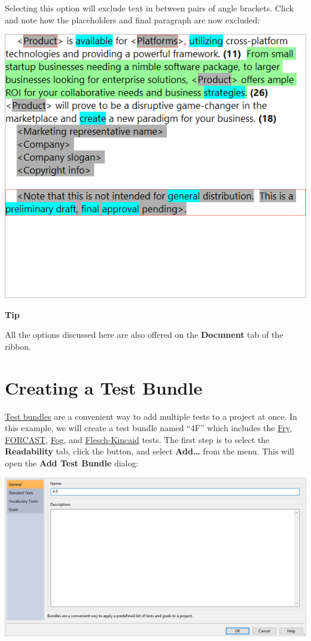 \documentclass[
]{book}
\newenvironment{tipsection}
    {
    \begin{tcolorbox}[colframe=lightgray,colback=lightyellow,arc=3mm]
    \faLightbulb[regular] \textbf{Tip} \newline
    }
    {
    \end{tcolorbox}
    }
\theoremstyle{definition}
\theoremstyle{definition}
\theoremstyle{definition}
\theoremstyle{definition}
\theoremstyle{remark}
\begin{document}
Selecting this option will exclude text in between pairs of angle brackets. Click  and note how the placeholders and final paragraph are now excluded:

\includegraphics{Images/ExclusionTagsExampleExcluding.png}

\begin{tipsection}
All the options discussed here are also offered on the \textbf{Document} tab of the ribbon.

\end{tipsection}

\hypertarget{creating-a-test-bundle}{%
\section{Creating a Test Bundle}\label{creating-a-test-bundle}}

\protect\hyperlink{test-bundles}{Test bundles} are a convenient way to add multiple tests to a project at once. In this example, we will create a test bundle named ``4F'' which includes the \protect\hyperlink{fry-test}{Fry}, \protect\hyperlink{forcast-test}{FORCAST}, \protect\hyperlink{gunning-fog-test}{Fog}, and \protect\hyperlink{flesch-kincaid-test}{Flesch-Kincaid} tests. The first step is to select the \textbf{Readability} tab, click the  button, and select \textbf{Add\ldots{}} from the menu. This will open the \textbf{Add Test Bundle} dialog:

\includegraphics{Images/TestBundle.png}
\end{document}
